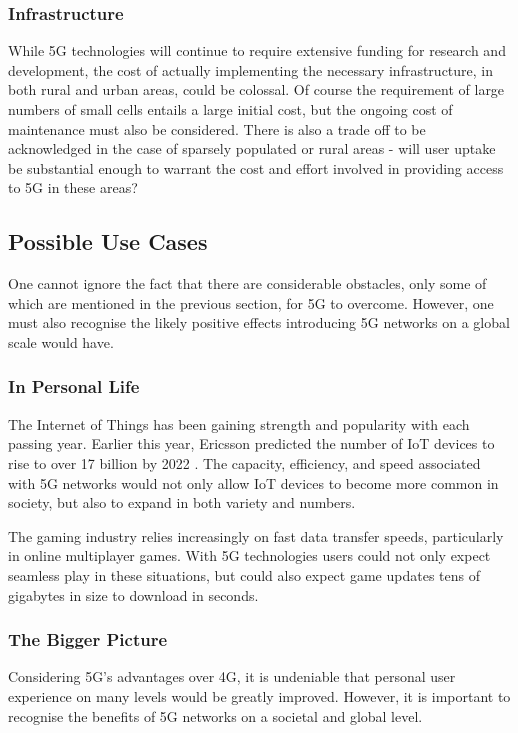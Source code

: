 \documentclass[journal]{IEEEtran}
\begin{document}
\subsubsection{Infrastructure}
While 5G technologies will continue to require extensive funding for research and development, the cost of actually implementing the necessary infrastructure, in both rural and urban areas, could be colossal. Of course the requirement of large numbers of small cells entails a large initial cost, but the ongoing cost of maintenance must also be considered. There is also a trade off to be acknowledged in the case of sparsely populated or rural areas - will user uptake be substantial enough to warrant the cost and effort involved in providing access to 5G in these areas? 

\subsection{Possible Use Cases}
One cannot ignore the fact that there are considerable obstacles, only some of which are mentioned in the previous section, for 5G to overcome. However, one must also recognise the likely positive effects introducing 5G networks on a global scale would have.

\subsubsection{In Personal Life}
The Internet of Things has been gaining strength and popularity with each passing year. Earlier this year, Ericsson predicted the number of IoT devices to rise to over 17 billion by 2022 \cite{ericssondev}. The capacity, efficiency, and speed associated with 5G networks would not only allow IoT devices to become more common in society, but also to expand in both variety and numbers.

The gaming industry relies increasingly on fast data transfer speeds, particularly in online multiplayer games. With 5G technologies users could not only expect seamless play in these situations, but could also expect game updates tens of gigabytes in size to download in seconds.

\subsubsection{The Bigger Picture}
Considering 5G's advantages over 4G, it is undeniable that personal user experience on many levels would be greatly improved. However, it is important to recognise the benefits of 5G networks on a societal and global level.
\end{document}
